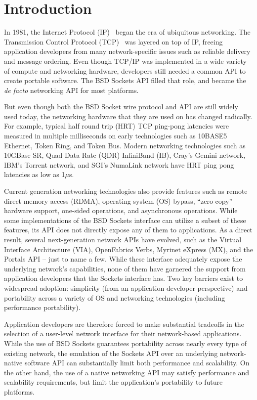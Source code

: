\section{Introduction}
\label{sec:introduction}


In 1981, the Internet Protocol (IP)~\cite{RFC791} began the era of
ubiquitous networking.  The Transmission Control Protocol
(TCP)~\cite{RFC793} was layered on top of IP, freeing application
developers from many network-specific issues such as reliable delivery
and message ordering.  Even though TCP/IP was implemented in a wide
variety of compute and networking hardware, developers still needed a
common API to create portable software.
%
The BSD Sockets API filled that role, and became the {\em de facto}
networking API for most platforms.  

But even though both the BSD Socket wire protocol and API are still
widely used today, the networking hardware that they are used on has
changed radically.
%
For example, typical half round trip (HRT) TCP ping-pong latencies
were measured in multiple milliseconds on early technologies such as
10BASE5 Ethernet, Token Ring, and Token Bus.
%
Modern networking technologies such as 10GBase-SR, Quad Data Rate
(QDR) InfiniBand (IB), Cray's Gemini network, IBM's Torrent network,
and SGI's NumaLink network have HRT ping pong latencies as low as
1$\mu$s.

Current generation networking technologies also provide features such
as remote direct memory access (RDMA), operating system (OS) bypass,
``zero copy'' hardware support, one-sided operations, and asynchronous
operations.
%
While some implementations of the BSD Sockets interface can utilize a
subset of these features, its API does not directly expose any of them
to applications.
%
As a direct result, several next-generation network APIs have evolved,
such as the Virtual Interface Architecture (VIA), OpenFabrics Verbs,
Myrinet eXpress (MX), and the Portals API -- just to name a few.
%
While these interface adequately expose the underlying network's
capabilities, none of them have garnered the support from application
developers that the Sockets interface has.
%
Two key barriers exist to widespread adoption: simplicity (from an
application developer perspective) and portability across a variety of
OS and networking technologies (including performance portability).

Application developers are therefore forced to make substantial
tradeoffs in the selection of a user-level network interface for their
network-based applications.
%
While the use of BSD Sockets guarantees portability across nearly
every type of existing network, the emulation of the Sockets API over
an underlying network-native software API can substantially limit both
performance and scalability.
%
On the other hand, the use of a native networking API may satisfy
performance and scalability requirements, but limit the application's
portability to future platforms.

